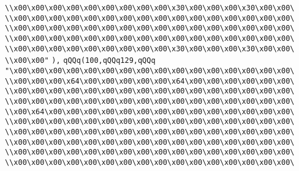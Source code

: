 \verb|\\x00\x00\x00\x00\x00\x00\x00\x00\x00\x30\x00\x00\x00\x30\x00\x00\|\newline
\verb|\\x00\x00\x00\x00\x00\x00\x00\x00\x00\x00\x00\x00\x00\x00\x00\x00\|\newline
\verb|\\x00\x00\x00\x00\x00\x00\x00\x00\x00\x00\x00\x00\x00\x00\x00\x00\|\newline
\verb|\\x00\x00\x00\x00\x00\x00\x00\x00\x00\x00\x00\x00\x00\x00\x00\x00\|\newline
\verb|\\x00\x00\x00\x00\x00\x00\x00\x00\x00\x30\x00\x00\x00\x30\x00\x00\|\newline
\verb|\\x00\x00"|\newline
\verb|),|\newline
\verb|qQQq(100,qQQq129,qQQq|\newline
\verb|"\x00\x00\x00\x00\x00\x00\x00\x00\x00\x00\x00\x00\x00\x00\x00\x00\|\newline
\verb|\\x00\x00\x00\x64\x00\x00\x00\x00\x00\x64\x00\x00\x00\x00\x00\x00\|\newline
\verb|\\x00\x00\x00\x00\x00\x00\x00\x00\x00\x00\x00\x00\x00\x00\x00\x00\|\newline
\verb|\\x00\x00\x00\x00\x00\x00\x00\x00\x00\x00\x00\x00\x00\x00\x00\x00\|\newline
\verb|\\x00\x64\x00\x00\x00\x00\x00\x00\x00\x00\x00\x00\x00\x00\x00\x00\|\newline
\verb|\\x00\x00\x00\x00\x00\x00\x00\x00\x00\x00\x00\x00\x00\x00\x00\x00\|\newline
\verb|\\x00\x00\x00\x00\x00\x00\x00\x00\x00\x00\x00\x00\x00\x00\x00\x00\|\newline
\verb|\\x00\x00\x00\x00\x00\x00\x00\x00\x00\x00\x00\x00\x00\x00\x00\x00\|\newline
\verb|\\x00\x00\x00\x00\x00\x00\x00\x00\x00\x00\x00\x00\x00\x00\x00\x00\|\newline
\verb|\\x00\x00\x00\x00\x00\x00\x00\x00\x00\x00\x00\x00\x00\x00\x00\x00\|\newline
